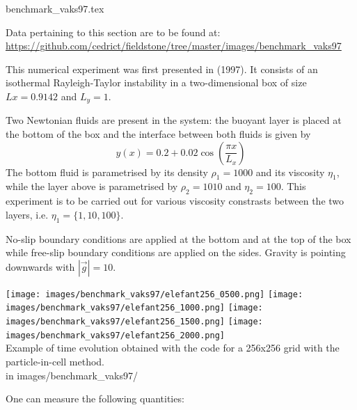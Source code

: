 \begin{flushright} {\tiny {\color{gray} benchmark\_vaks97.tex}} \end{flushright}

\vspace{1cm}
\begin{flushright}
Data pertaining to this section are to be found at:
\url{https://github.com/cedrict/fieldstone/tree/master/images/benchmark_vaks97}
\end{flushright}
\vspace{1cm}


This numerical experiment was first presented in \textcite{vaks97} (1997).
It consists of an isothermal Rayleigh-Taylor instability in a two-dimensional box
of size $Lx=0.9142$ and $L_y=1$.

Two Newtonian fluids are present in the system: the buoyant layer is 
placed at the bottom of the box and the interface between both fluids 
is given by 
\begin{equation}
y(x)=0.2+0.02\cos \left( \frac{\pi x}{L_x}  \right)
\end{equation}
The bottom fluid is parametrised by its density $\rho_1=1000$ and 
its viscosity $\eta_1$, while the layer above is parametrised 
by $\rho_2=1010$ and $\eta_2=100$.
This experiment is to be carried out for various viscosity constrasts between the 
two layers, i.e. $\eta_1=\{1,10,100\}$.

No-slip boundary conditions are applied at the bottom and at the top of the box 
while free-slip boundary conditions are applied on the sides.
Gravity is pointing downwards with $|\vec{g}|=10$. 

\begin{center}
\texttt{[image: images/benchmark\_vaks97/elefant256\_0500.png]}
\texttt{[image: images/benchmark\_vaks97/elefant256\_1000.png]}
\texttt{[image: images/benchmark\_vaks97/elefant256\_1500.png]}
\texttt{[image: images/benchmark\_vaks97/elefant256\_2000.png]}\\
{\captionfont Example of time evolution obtained with the \elefant code for 
a 256x256 grid with the particle-in-cell method.\\
{\tiny {\color{gray} in images/benchmark\_vaks97/}}  }
\end{center}

One can measure the following quantities:

